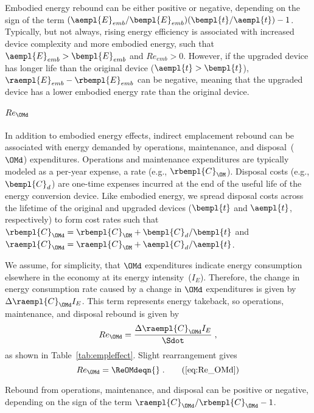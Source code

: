 Embodied energy rebound can be either positive or negative, depending on 
the sign of the term
$(\aempl{E}_{emb}/\bempl{E}_{emb})(\bempl{t}/\aempl{t}) - 1$.
Typically, but not always,
rising energy efficiency is associated with increased device complexity
and more embodied energy,
such that $\aempl{E}_{emb} > \bempl{E}_{emb}$ and $Re_{emb} > 0$.
However, if the upgraded device has longer life than the original device
($\aempl{t} > \bempl{t}$),
$\raempl{E}_{emb} - \rbempl{E}_{emb}$ can be negative,
meaning that the upgraded device has a lower embodied energy rate than the original device.


\paragraph{$Re_{\OMd}$} 
\label{sec:Re_OMd}

In addition to embodied energy effects, 
indirect emplacement rebound 
can be associated with energy demanded by operations, maintenance, and disposal~($\OMd$) expenditures.
Operations and maintenance expenditures are typically modeled as a per-year expense, 
a rate (e.g., $\rbempl{C}_{\OM}$).
Disposal costs (e.g., $\bempl{C}_d$) are one-time expenses incurred at the end of the useful life of the energy conversion device.
Like embodied energy, we spread disposal costs across the lifetime 
of the original and upgraded devices ($\bempl{t}$ and $\aempl{t}$, respectively)
to form cost rates such that $\rbempl{C}_{\OMd} = \rbempl{C}_{\OM} + \bempl{C}_d/\bempl{t}$
and
$\raempl{C}_{\OMd} = \raempl{C}_{\OM} + \aempl{C}_d/\aempl{t}$.

We assume, for simplicity, that $\OMd$ expenditures indicate energy consumption
elsewhere in the economy at its energy intensity~($I_E$).
Therefore, the change in energy consumption rate caused by a change in $\OMd$ expenditures
is given by $\Delta \raempl{C}_{\OMd} I_E$.
This term represents energy takeback, so operations, maintenance, and disposal rebound is given by
%
\begin{equation} \label{eq:Re_OMd_def}
  Re_{\OMd} = \frac{\Delta \raempl{C}_{\OMd} I_E}{\Sdot} \; ,
\end{equation}
%
as shown in Table~\ref{tab:empleffect}.
Slight rearrangement gives
%
\begin{equation}
  Re_{\OMd} = \ReOMdeqn{} \; . \tag{\ref{eq:Re_OMd}}
\end{equation}

Rebound from operations, maintenance, and disposal can be positive or negative,
depending on the sign of the term $\raempl{C}_{\OMd}/\rbempl{C}_{\OMd} - 1$.


